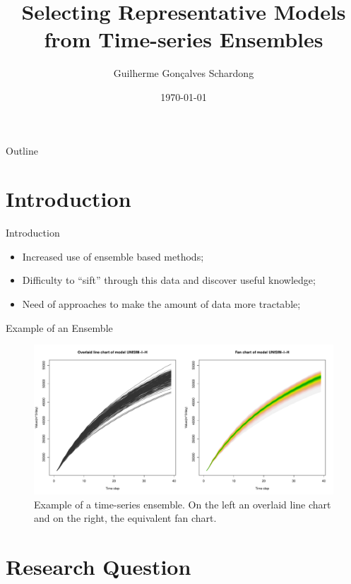 \documentclass{beamer}
\title{Selecting Representative Models from Time-series Ensembles}
\author{Guilherme Gon\c{c}alves Schardong}
\date{\today}
\begin{document}
	
\begin{frame}
  \titlepage
\end{frame}

\begin{frame}{Outline}
  \tableofcontents
\end{frame}

\section{Introduction}
\begin{frame}
  \tableofcontents[currentsection]
\end{frame}

\begin{frame}{Introduction}
  \begin{itemize}
    \item Increased use of ensemble based methods;
    \item Difficulty to ``sift'' through this data and discover useful knowledge;
    \item Need of approaches to make the amount of data more tractable;
  \end{itemize}
\end{frame}

\begin{frame}{Example of an Ensemble}
  \begin{figure}
    \includegraphics[width=\columnwidth]{line-fan.pdf}
    \caption{Example of a time-series ensemble. On the left an overlaid line chart and on the right, the equivalent fan chart.}
    \label{fig:sample}
  \end{figure}
\end{frame}

\section{Research Question}
\begin{frame}
  \tableofcontents[currentsection]
\end{frame}
\end{document}
